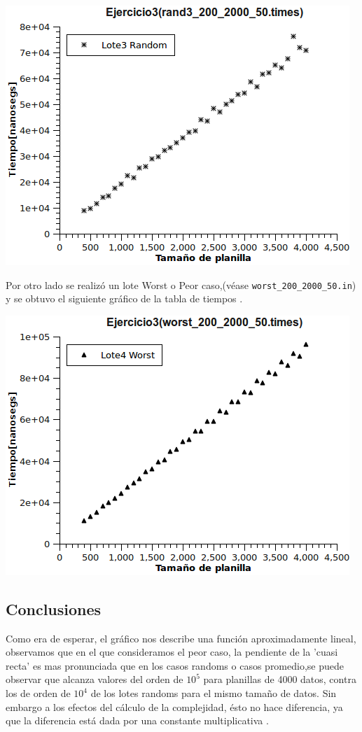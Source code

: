 \includegraphics[scale=0.8]{img/ej3/Graph3.png}
\newline


Por otro lado se realizó un lote Worst o Peor caso,(véase \texttt{worst\_200\_2000\_50.in}) y se obtuvo el siguiente gráfico de la tabla de tiempos .

\includegraphics[scale=0.8]{img/ej3/Graph4.png}





\subsection{Conclusiones}

Como era de esperar, el gráfico nos describe una función aproximadamente lineal, observamos que en el que consideramos el peor caso, la pendiente de la 'cuasi recta' es mas pronunciada que en los casos randoms o casos promedio,se puede observar que alcanza valores del orden de $10^{5}$ para planillas de 4000 datos, contra los de orden de $10^{4}$ de los lotes randoms para el mismo tamaño de datos. 
\newline
Sin embargo a los efectos del cálculo de la complejidad, ésto no hace diferencia, ya que la diferencia está dada por una constante multiplicativa .



